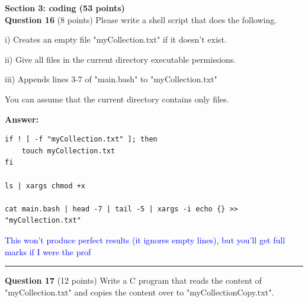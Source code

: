 \documentclass{exam}
\begin{document}
{\Large\textbf{Section 3: coding (53 points)}}
\\

\textbf{Question 16} (8 points) Please write a shell script that does the following.

i) Creates an empty file "myCollection.txt" if it doesn't exist.

ii) Give all files in the current directory executable permissions.

iii) Appends lines 3-7 of "main.bash" to "myCollection.txt"

You can assume that the current directory contains only files. 

\textbf{Answer:}

\begin{lstlisting}
if ! [ -f "myCollection.txt" ]; then
    touch myCollection.txt
fi

ls | xargs chmod +x 

cat main.bash | head -7 | tail -5 | xargs -i echo {} >> "myCollection.txt" 
\end{lstlisting}

\textcolor{blue}{This won't produce perfect results (it ignores empty lines), but you'll get full marks if I were the prof}

\newpage




\begin{center}\noindent\rule{6in}{0.4pt}\end{center}

\textbf{Question 17} (12 points) Write a C program that reads the content of "myCollection.txt" and copies the content over to "myCollectionCopy.txt".
\end{document}
